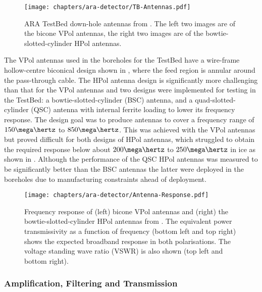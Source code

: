 \begin{figure}[htpb]
  \centering
  \texttt{[image: chapters/ara-detector/TB-Antennas.pdf]}
  \caption{ARA TestBed down-hole antennas from  \cite{Allison2012457}. The left two images are of the bicone VPol antennas, the right two images are of the bowtie-slotted-cylinder HPol antennas.}
  \label{fig:ara-detector:TestBed:Antennas}
\end{figure}

The VPol antennas used in the boreholes for the TestBed have a wire-frame hollow-centre biconical design shown in , where the feed region is annular around the pass-through cable. The HPol antenna design is significantly more challenging than that for the VPol antennas and two designs were implemented for testing in the TestBed: a bowtie-slotted-cylinder (BSC) antenna, and a quad-slotted-cylinder (QSC) antenna with internal ferrite loading to lower its frequency response. The design goal was to produce antennas to cover a frequency range of $150 \mega \hertz$ to $850 \mega \hertz$. This was achieved with the VPol antennas but proved difficult for both designs of HPol antennas, which struggled to obtain the required response below about $200 \mega \hertz$ to $250 \mega \hertz$ in ice as shown in . Although the performance of the QSC HPol antennas was measured to be significantly better than the BSC antennas the latter were deployed in the boreholes due to manufacturing constraints ahead of deployment.

\begin{figure}[htpb]
  \centering
  \texttt{[image: chapters/ara-detector/Antenna-Response.pdf]}
  \caption{Frequency response of (left) bicone VPol antennas and (right) the bowtie-slotted-cylinder HPol antennas from \cite{Allison2012457}. The equivalent power transmissivity as a function of frequency  (bottom left and top right) shows the expected broadband response in both polarisations. The voltage standing wave ratio (VSWR) is also shown (top left and bottom right).}
  \label{fig:ara-detector:TestBed:Signal-Chain:Frequency-Response}
\end{figure}

\subsubsection{Amplification, Filtering and Transmission}
\label{sec:ara-detector:TestBed:Amplification-Filtering-Transmission}

